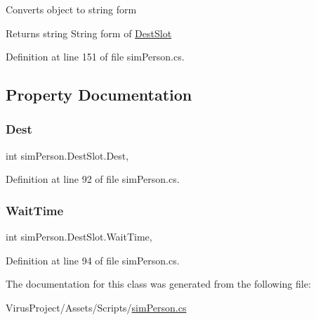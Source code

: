 Converts object to string form

\begin{DoxyReturn}{Returns}
string String form of \hyperlink{classsim_person_1_1_dest_slot}{Dest\+Slot} 
\end{DoxyReturn}


Definition at line 151 of file sim\+Person.\+cs.



\subsection{Property Documentation}
\hypertarget{classsim_person_1_1_dest_slot_ab8e2c3efcdc50551870cb472ea4dc85b}{}\label{classsim_person_1_1_dest_slot_ab8e2c3efcdc50551870cb472ea4dc85b} 
\subsubsection{\texorpdfstring{Dest}{Dest}}
{\footnotesize\ttfamily int sim\+Person.\+Dest\+Slot.\+Dest\hspace{0.3cm}{\ttfamily [get]}, {\ttfamily [set]}}



Definition at line 92 of file sim\+Person.\+cs.

\hypertarget{classsim_person_1_1_dest_slot_a6ab5b25156f6631d1e3b5c66e274f0d3}{}\label{classsim_person_1_1_dest_slot_a6ab5b25156f6631d1e3b5c66e274f0d3} 
\subsubsection{\texorpdfstring{Wait\+Time}{WaitTime}}
{\footnotesize\ttfamily int sim\+Person.\+Dest\+Slot.\+Wait\+Time\hspace{0.3cm}{\ttfamily [get]}, {\ttfamily [set]}}



Definition at line 94 of file sim\+Person.\+cs.



The documentation for this class was generated from the following file\+:\begin{DoxyCompactItemize}
\item 
Virus\+Project/\+Assets/\+Scripts/\hyperlink{sim_person_8cs}{sim\+Person.\+cs}\end{DoxyCompactItemize}
